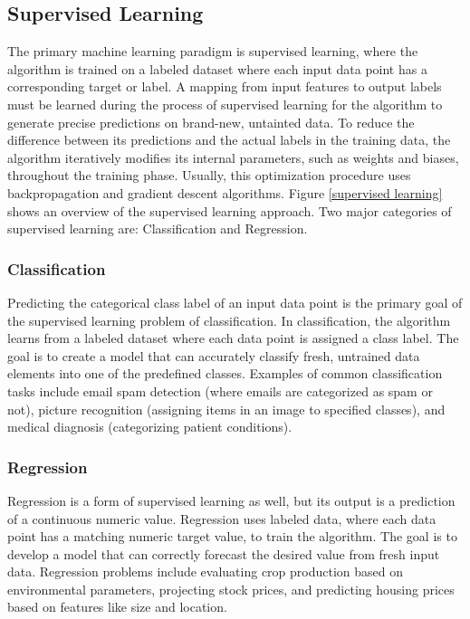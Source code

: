 \documentclass[a4paper,12pt]{report}%
\renewcommand{\\}{\vspace*{0.5\baselineskip} \newline}
\begin{document}
\subsection{Supervised Learning}
The primary machine learning paradigm is supervised learning, where the algorithm is trained on a labeled dataset where each input data point has a corresponding target or label. A mapping from input features to output labels must be learned during the process of supervised learning for the algorithm to generate precise predictions on brand-new, untainted data. To reduce the difference between its predictions and the actual labels in the training data, the algorithm iteratively modifies its internal parameters, such as weights and biases, throughout the training phase. Usually, this optimization procedure uses backpropagation and gradient descent algorithms. Figure \ref{supervised learning} shows an overview of the supervised learning
approach. Two major categories of supervised learning are: Classification and 
Regression. 



\subsubsection{Classification}
Predicting the categorical class label of an input data point is the primary goal of the supervised learning problem of classification. In classification, the algorithm learns from a labeled dataset where each data point is assigned a class label. The goal is to create a model that can accurately classify fresh, untrained data elements into one of the predefined classes. Examples of common classification tasks include email spam detection (where emails are categorized as spam or not), picture recognition (assigning items in an image to specified classes), and medical diagnosis (categorizing patient conditions).

\subsubsection{Regression}
Regression is a form of supervised learning as well, but its output is a prediction of a continuous numeric value. Regression uses labeled data, where each data point has a matching numeric target value, to train the algorithm. The goal is to develop a model that can correctly forecast the desired value from fresh input data. Regression problems include evaluating crop production based on environmental parameters, projecting stock prices, and predicting housing prices based on features like size and location.
\end{document}
